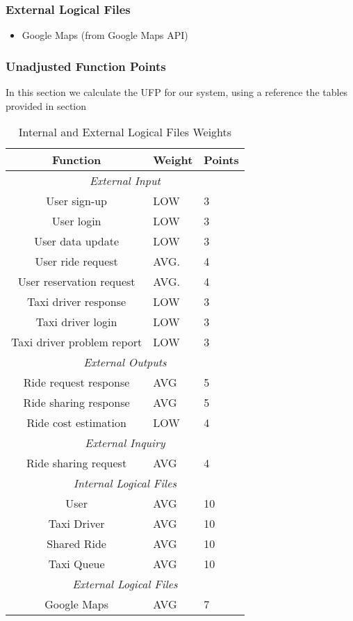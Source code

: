 \subsubsection{External Logical Files} %
\label{sub:internal_logical_files}
\begin{itemize}
	\item Google Maps (from Google Maps API)
\end{itemize}

\subsubsection{Unadjusted Function Points} %
\label{sub:unadjusted_function_points}
In this section we calculate the UFP for our system, using a reference the tables provided in section 

\begin{table}[!htbp]
\caption{Internal and External Logical Files Weights}
\begin{tabularx}{\textwidth}{|c|X|X|}
\hline
\textbf{\textbf{Function}}      & \textbf{Weight} & \textbf{Points}  
\\ \hline
\multicolumn{3}{|c|}{\emph{External Input}}
\\ \hline
User sign-up 	& LOW  & 3		
\\ \hline
User login 	& LOW  & 3		
\\ \hline							                
User data update & LOW & 3
\\ \hline	
User ride request & AVG. & 4	
\\ \hline
User reservation request & AVG. & 4
\\ \hline	
Taxi driver response & LOW & 3	
\\ \hline
Taxi driver login & LOW & 3	
\\ \hline
Taxi driver problem report & LOW & 3	
\\ \hline
\multicolumn{3}{|c|}{\emph{External Outputs}}
\\ \hline
Ride request response & AVG & 5
\\ \hline
Ride sharing response & AVG & 5	
\\ \hline
Ride cost estimation & LOW & 4	
\\ \hline
\multicolumn{3}{|c|}{\emph{External Inquiry}}
\\ \hline
Ride sharing request & AVG & 4	
\\ \hline
\multicolumn{3}{|c|}{\emph{Internal Logical Files}}
\\ \hline
User & AVG & 10	
\\ \hline
Taxi Driver & AVG & 10	
\\ \hline
Shared Ride & AVG & 10	
\\ \hline
Taxi Queue & AVG & 10	
\\ \hline
\multicolumn{3}{|c|}{\emph{External Logical Files}}
\\ \hline
Google Maps & AVG & 7	
\\ \hline
\end{tabularx}
\end{table}


